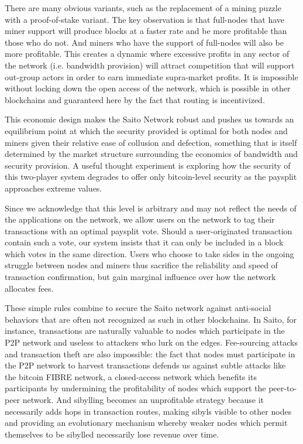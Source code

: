 \documentclass[11.5pt, oneside]{article}   	%
\begin{document}
\begin{multicols}{2}
There are many obvious variants, such as the replacement of a mining puzzle with a proof-of-stake variant. The key observation is that full-nodes that have miner support will produce blocks at a faster rate and be more profitable than those who do not. And miners who have the support of full-nodes will also be more profitable. This creates a dynamic where excessive profits in any sector of the network (i.e. bandwidth provision) will attract competition that will support out-group actors in order to earn immediate supra-market profits. It is impossible without locking down the open access of the network, which is possible in other blockchains and guaranteed here by the fact that routing is incentivized.

This economic design makes the Saito Network robust and pushes us towards an equilibrium point at which the security provided is optimal for both nodes and miners given their relative ease of collusion and defection, something that is itself determined by the market structure surrounding the economics of bandwidth and security provision. A useful thought experiment is exploring how the security of this two-player system degrades to offer only bitcoin-level security as the paysplit approaches extreme values.

Since we acknowledge that this level is arbitrary and may not reflect the needs of the applications on the network, we allow users on the network to tag their transactions with an optimal paysplit vote. Should a user-originated transaction contain such a vote, our system insists that it can only be included in a block which votes in the same direction. Users who choose to take sides in the ongoing struggle between nodes and miners thus sacrifice the reliability and speed of transaction confirmation, but gain marginal influence over how the network allocates fees.

These simple rules combine to secure the Saito network against anti-social behaviors that are often not recognized as such in other blockchains. In Saito, for instance, transactions are naturally valuable to nodes which participate in the P2P network and useless to attackers who lurk on the edges. Fee-sourcing attacks and transaction theft are also impossible: the fact that nodes must participate in the P2P network to harvest transactions defends us against subtle attacks like the bitcoin FIBRE network, a closed-access network which benefits its participants by undermining the profitability of nodes which support the peer-to-peer network. And sibylling becomes an unprofitable strategy because it necessarily adds hops in transaction routes, making sibyls visible to other nodes and providing an evolutionary mechanism whereby weaker nodes which permit themselves to be sibylled necessarily lose revenue over time. 


\end{multicols}
\end{document}
